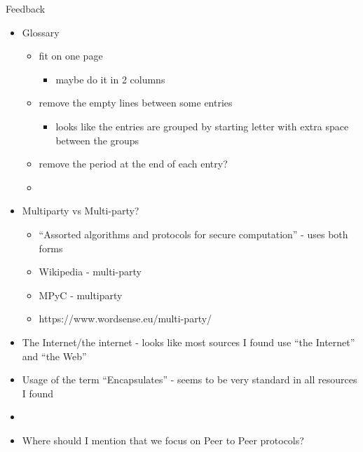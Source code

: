 \label{notes__08000-feedback.md}
\begin{frame}{Feedback}
\label{notes__08000-feedback.md__feedback}
\begin{itemize}
\tightlist
\item
  Glossary

  \begin{itemize}
  \tightlist
  \item
    fit on one page

    \begin{itemize}
    \tightlist
    \item
      maybe do it in 2 columns
    \end{itemize}
  \item
    remove the empty lines between some entries

    \begin{itemize}
    \tightlist
    \item
      looks like the entries are grouped by starting letter with extra space between the groups
    \end{itemize}
  \item
    remove the period at the end of each entry?
  \item
  \end{itemize}
\item
  Multiparty vs Multi-party?

  \begin{itemize}
  \tightlist
  \item
    ``Assorted algorithms and protocols for secure computation'' - uses both forms
  \item
    Wikipedia - multi-party
  \item
    MPyC - multiparty
  \item
    https://www.wordsense.eu/multi-party/
  \end{itemize}
\item
  The Internet/the internet - looks like most sources I found use ``the Internet'' and ``the Web''
\item
  Usage of the term ``Encapsulates'' - seems to be very standard in all resources I found
\item
\item
  Where should I mention that we focus on Peer to Peer protocols?
\end{itemize}
\end{frame}

